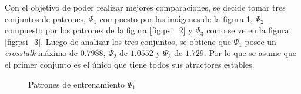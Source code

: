 \documentclass{sig-alternate}
\begin{document}
Con el objetivo de poder realizar mejores comparaciones, se decide tomar tres conjuntos de patrones, $\Psi_1$ compuesto por las imágenes de la figura \ref{fig:psi_1}, $\Psi_2$ compuesto por los patrones de la figura \ref{fig:psi_2} y  $\Psi_3$ como se ve en la figura \ref{fig:psi_3}. Luego de analizar los tres conjuntos, se obtiene que $\Psi_1$ posee un \textit{crosstalk} máximo de $0.7988$,  $\Psi_2$ de $1.0552$ y  $\Psi_3$ de $1.729$. Por lo que se asume que el primer conjunto es el único que tiene todos sus atractores estables. \\
\begin{figure}[ht]
	\begin{center}
		\hspace{10pt}
		\hspace{10pt}
		\hspace{10pt}
		\hspace{10pt}
	\end{center}
\caption{Patrones de entrenamiento $\Psi_1$}
\label{fig:psi_1}
\end{figure}
	
\end{document}
